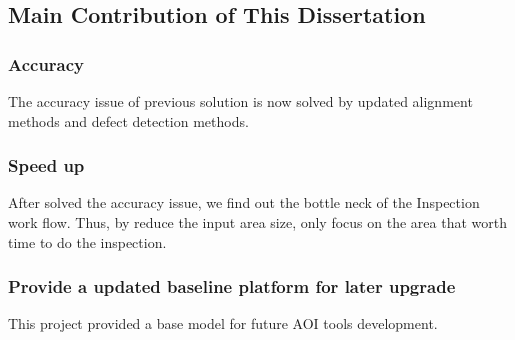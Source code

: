 	\subsection{Main Contribution of This Dissertation}
	\label{subsec:advantages}
		\subsubsection{Accuracy}
			The accuracy issue of previous solution is now solved by updated alignment methods and defect detection methods.

		\subsubsection{Speed up}
			After solved the accuracy issue, we find out the bottle neck of the Inspection work flow. Thus, by reduce the input area size, only focus on the area that worth time to do the inspection.

		\subsubsection{Provide a updated baseline platform for later upgrade}
			This project provided a base model for future AOI tools development.
